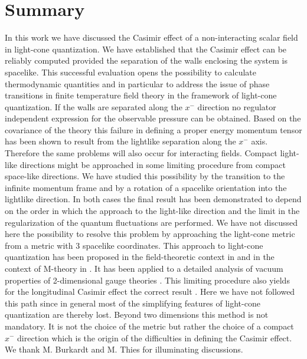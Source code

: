 \documentclass[a4paper,twocolumn,eqsecnum,aps]{revtex4}
\begin{document}
\section{Summary}
In this work we have discussed the Casimir effect of a non-interacting scalar field in light-cone quantization. We have established that the Casimir effect can be reliably computed provided the separation of the walls enclosing the system is  spacelike. This successful evaluation opens the possibility to calculate thermodynamic quantities  and in particular to address the issue of phase transitions in finite temperature field theory in the framework of light-cone quantization. If the walls are separated along the $x^{-}$ direction no regulator independent expression for the observable pressure can be obtained. Based on the covariance of the theory  this failure in defining a proper energy momentum tensor has been shown to result from the  lightlike separation along the $x^{-}$ axis. Therefore the same problems will  also occur for interacting fields. Compact  light-like directions might be approached in some limiting procedure from compact space-like directions. We have studied this possibility by the transition to the infinite momentum frame and by a rotation of a spacelike orientation into the lightlike direction. In both cases the final result has been demonstrated to depend on the order in which the approach to the light-like direction and the limit in the regularization of the quantum fluctuations are performed. We have not discussed here the possibility to resolve this problem by approaching the light-cone metric from a metric with 3 spacelike coordinates. This approach to light-cone quantization has been proposed in the field-theoretic context in \cite{FR,ltly91} and in the context of M-theory in \cite{POL99,bilal1,bilal2}. It has been applied  to a detailed analysis of vacuum properties of 2-dimensional gauge theories \cite{ltly91}. This limiting procedure  also yields for the longitudinal Casimir effect the correct result \cite{Stei01}. Here we have not followed this path since in general   most of  the simplifying features of light-cone quantization are thereby lost.  Beyond two dimensions this method is not mandatory. It is not the choice of the metric  but rather the choice of a compact $x^{-}$ direction which is the origin of the difficulties in defining the  Casimir effect.  
\vskip 0.5cm
We thank M. Burkardt and M. Thies for illuminating discussions.
\vskip 0.5cm 
\
\end{document}
